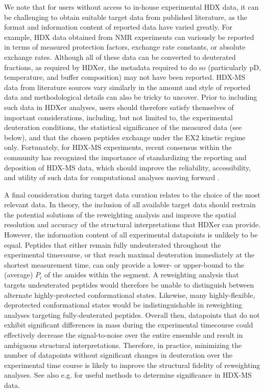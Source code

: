 \documentclass[9pt,tutorial,ASAPversion]{livecoms}
\begin{document}
We note that for users without access to in-house experimental HDX data, it can be challenging to obtain suitable target data from published literature, as the format and information content of reported data have varied greatly.
For example, HDX data obtained from NMR experiments can variously be reported in terms of measured protection factors, exchange rate constants, or absolute exchange rates.
Although all of these data can be converted to deuterated fractions, as required by HDXer, the metadata required to do so (particularly pD, temperature, and buffer composition) may not have been reported.
HDX-MS data from literature sources vary similarly in the amount and style of reported data and methodological details can also be tricky to uncover.
Prior to including such data in HDXer analyses, users should therefore satisfy themselves of important considerations, including, but not limited to, the experimental deuteration conditions, the statistical significance of the measured data (see below), and that the chosen peptides exchange under the EX2 kinetic regime only.
Fortunately, for HDX-MS experiments, recent consensus within the community has recognized the importance of standardizing the reporting and deposition of HDX-MS data, which should improve the reliability, accessibility, and utility of such data for computational analyses moving forward \cite{Masson2019}.

A final consideration during target data curation relates to the choice of the most relevant data. 
In theory, the inclusion of all available target data should restrain the potential solutions of the reweighting analysis and improve the spatial resolution and accuracy of the structural interpretations that HDXer can provide.
However, the information content of all experimental datapoints is unlikely to be equal.
Peptides that either remain fully undeuterated throughout the experimental timecourse, or that reach maximal deuteration immediately at the shortest measurement time, can only provide a lower- or upper-bound to the (average) $P_i$ of the amides within the segment.
A reweighting analysis that targets undeuterated peptides would therefore be unable to distinguish between alternate highly-protected conformational states.
Likewise, many highly-flexible, deprotected conformational states would be indistinguishable in reweighting analyses targeting fully-deuterated peptides.
Overall then, datapoints that do not exhibit significant differences in mass during the experimental timecourse could effectively decrease the signal-to-noise over the entire ensemble and result in ambiguous structural interpretations.
Therefore, in practice, minimizing the number of datapoints without significant changes in deuteration over the experimental time course is likely to improve the structural fidelity of reweighting analyses. 
See also e.g. \cite{Hageman2019, Weis2021} for useful methods to determine significance in HDX-MS data.
\end{document}
